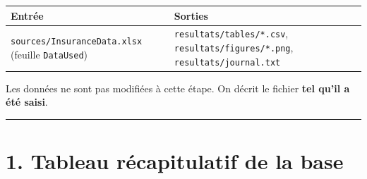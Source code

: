 \documentclass[

  french,

  10pt,

  a4paper,

]{article}
\newcounter{none} %
\begin{document}
{\def\LTcaptype{none} %

\begin{longtable}[]{@{}

  >{\raggedright\arraybackslash}p{}

  >{\raggedright\arraybackslash}p{}@{}}

\toprule\noalign{}

\begin{minipage}[b]{\linewidth}\raggedright

Entrée

\end{minipage} & \begin{minipage}[b]{\linewidth}\raggedright

Sorties

\end{minipage} \\

\midrule\noalign{}

\endhead

\bottomrule\noalign{}

\endlastfoot

\texttt{sources/InsuranceData.xlsx} (feuille \texttt{DataUsed}) & \texttt{resultats/tables/*.csv}, \texttt{resultats/figures/*.png}, \texttt{resultats/journal.txt} \\

\end{longtable}

}



Les données ne sont pas modifiées à cette étape. On décrit le fichier \textbf{tel qu'il a été saisi}.



\begin{center}\rule{0.5\linewidth}{0.5pt}\end{center}



\section{1. Tableau récapitulatif de la base}
\end{document}
